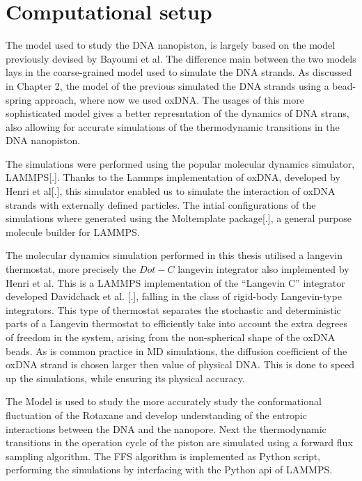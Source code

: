\section{Computational setup}

The model used to study the DNA nanopiston, is largely based on the model
previously devised by Bayoumi et al. The difference main between the two models lays in
the coarse-grained model used to simulate the DNA strands. As discussed in Chapter 2, the
model of the previous simulated the DNA strands using a bead-spring approach, where now
we used oxDNA. The usages of this more sophisticated model gives a better represntation
of the dynamics of DNA strans, also allowing for accurate simulations of the
thermodynamic transitions in the DNA nanopiston.

The simulations were performed using the popular molecular dynamics simulator, LAMMPS[.].
Thanks to the Lammps implementation of oxDNA, developed by Henri et al[.],  this
simulator enabled us to simulate the interaction of oxDNA strands with externally defined
particles. The intial configurations of the simulations where generated using the
Moltemplate package[.], a general purpose molecule builder for LAMMPS.

The molecular dynamics simulation performed in this thesis utilised a langevin
thermostat, more precisely the $Dot-C$ langevin integrator also implemented by Henri et
al. This is a LAMMPS implementation of the “Langevin C” integrator developed Davidchack
et al. [.], falling in the class of  rigid-body Langevin-type integrators. This type of
thermostat separates the stochastic and deterministic parts of a Langevin thermostat to
efficiently take into account the extra degrees of freedom in the system, arising from
the non-spherical shape of the oxDNA beads. As is common practice in MD simulations, the
diffusion coefficient of the oxDNA strand is chosen larger then value of physical DNA.
This is done to speed up the simulations, while ensuring its physical accuracy.

The Model is used to study the more accurately study the conformational fluctuation of
the Rotaxane and develop understanding of the entropic interactions between the DNA and
the nanopore. Next the thermodynamic transitions in the operation cycle of the piston are
simulated using a forward flux sampling algorithm. The FFS algorithm is implemented as
Python script, performing the simulations by interfacing with the Python api of LAMMPS.

